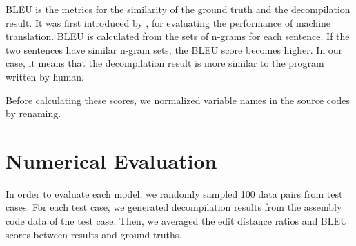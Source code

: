 \documentclass[11pt]{jarticle}
\begin{document}
BLEU is the metrics for the similarity of the ground truth and the decompilation result. 
It was first introduced by \citet{BLEU}, for evaluating the performance of machine translation.
BLEU is calculated from the sets of n-grams for each sentence. 
If the two sentences have similar n-gram sets, the BLEU score becomes higher.
In our case, it means that the decompilation result is more similar to the program written by human. %


Before calculating these scores, we normalized variable names in the source codes by renaming.









\section{Numerical Evaluation}
In order to evaluate each model, we randomly sampled 100 data pairs from test cases.
For each test case, we generated decompilation results from the assembly code data of the test case.
Then, we averaged the edit distance ratios and BLEU scores between results and ground truths.
\end{document}
